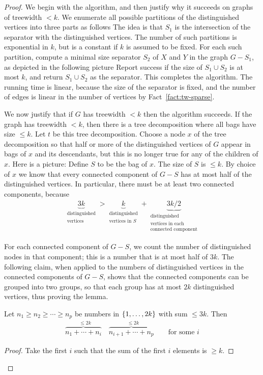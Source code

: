 \begin{proof}
	We begin with the algorithm, and then justify why it succeeds on graphs of treewidth $<k$.  We enumerate all possible partitions of the distinguished vertices into three parts as follows
	 The idea is that $S_1$ is the intersection of the separator with the distinguished vertices. The number of such partitions is exponential in $k$, but is a constant if $k$ is assumed to be fixed. For each such partition,  compute a minimal size separator $S_2$ of $X$ and $Y$ in the graph $G-S_1$, as depicted in the following picture
	  Report success if the size of $S_1 \cup S_2$ is at most $k$, and return $S_1 \cup S_2$ as the separator. This completes the algorithm. The running time is linear, because the size of the separator is fixed, and the number of edges is linear in the number of vertices by Fact~\ref{fact:tw-sparse}.

We now justify that if $G$ has treewidth $<k$ then the algorithm succeeds. If the graph has treewidth $<k$, then there is a tree decomposition where all bags have size  $\le k$. Let $t$ be this tree decomposition. Choose a node $x$ of the tree decomposition so that  half or more of the distinguished vertices of $G$ appear in bags of $x$ and its descendants, but this is no longer true for any of the children of $x$. Here is a picture:
 Define $S$ to be the bag of $x$. The size of $S$ is  $\le k$. By choice of $x$ we know that every connected component of $G-S$ has at most half of the distinguished vertices. In particular, there must be at least two connected components, because
 \begin{align*}
\underbrace{3k}_{\substack{\text{distinguished}\\ \text{vertices}}} > \underbrace{k}_{\substack{\text{distinguished}\\ \text{vertices in $S$} }} + \underbrace{3k/2}_{\substack{\text{distinguished}\\ \text{vertices in each} \\ \text{connected component} }}
\end{align*}

 For each connected component of $G-S$, we count the number of distinguished nodes in that component; this is a number that is at most half of $3k$.  The following claim, when applied to the numbers of distinguished vertices in the connected components of $G-S$, shows that the connected components can be grouped into two groups, so that each group has at most $2k$ distinguished vertices, thus proving the lemma.
 \begin{claim}
 	Let $n_1 \ge n_2 \ge \cdots \ge n_p$ be numbers in $\{1,\ldots,2k\}$ with sum $\le 3k$. Then
 	\begin{align*}
 		\overbrace{n_1 + \cdots + n_i}^{\text{ $\le 2k$}}  \quad \overbrace{n_{i+1} + \cdots + n_p}^{\text{ $\le 2k$}} \qquad \text{for some $i$}
 	\end{align*}
 \end{claim}
 \begin{proof}
 Take the first $i$ such that the sum of the first $i$ elements is $\ge k$.  
 \end{proof}
\end{proof}


